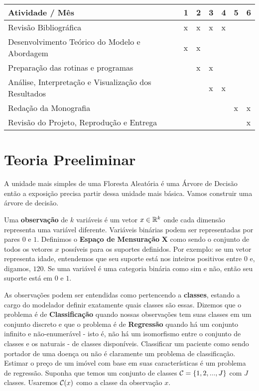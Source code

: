 \begin{table}[h]
\begin{tabular}{|l|l|l|l|l|l|l|}
\hline
Atividade / Mês                                         & 1 & 2 & 3 & 4 & 5 & 6 \\ \hline
Revisão Bibliográfica                                   & x & x & x & x &   &   \\ \hline
Desenvolvimento Teórico do Modelo e Abordagem           & x & x &   &   &   &   \\ \hline
Preparação das rotinas e programas                      &   & x & x &   &   &   \\ \hline
Análise, Interpretação e Visualização dos Resultados    &   &   & x & x &   &   \\ \hline
Redação da Monografia                                   &   &   &   &   & x & x \\ \hline
Revisão do Projeto, Reprodução e Entrega &   &   &   &   &   & x \\ \hline
\end{tabular}
\end{table}

\section{Teoria Preeliminar}

A unidade mais simples de uma Floresta Aleatória é uma Árvore de Decisão \cite{breiman2017classification} então a exposição precisa partir dessa unidade mais básica. Vamos construir uma árvore de decisão.

Uma \textbf{observação} de $k$ variáveis é um vetor $x \in \mathbb{R}^k$ onde cada dimensão representa uma variável diferente. Variáveis binárias podem ser representadas por pares $0$ e $1$. Definimos o \textbf{Espaço de Mensuração} $\mathbf{X}$ como sendo o conjunto de todos os vetores $x$ possíveis para os suportes definidos. Por exemplo: se um vetor representa idade, entendemos que seu suporte está nos inteiros positivos entre $0$ e, digamos, $120$. Se uma variável é uma categoria binária como sim e não, então seu suporte está em $0$ e $1$. 

As observações podem ser entendidas como pertencendo a \textbf{classes}, estando a cargo do modelador definir exatamente quais classes são essas. Dizemos que o problema é de \textbf{Classificação} quando nossas observações tem suas classes em um conjunto discreto e que o problema é de \textbf{Regressão} quando há um conjunto infinito e não-enumerável - isto é, não há um isomorfismo entre o conjunto de classes e os naturais - de classes disponíveis. Classificar um paciente como sendo portador de uma doença ou não é claramente um problema de classificação. Estimar o preço de um imóvel com base em suas características é um problema de regressão. Suponha que temos um conjunto de classes $\mathcal{C} = \{1,2,...,J\}$ com $J$ classes. Usaremos $\mathcal{C}(x)$ como a classe da observação $x$. 

